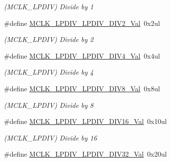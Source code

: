 \begin{DoxyCompactItemize}
\begin{DoxyCompactList}\small\item\em (M\+C\+L\+K\+\_\+\+L\+P\+D\+I\+V) Divide by 1 \end{DoxyCompactList}\item 
\hypertarget{group___s_a_m_l21___m_c_l_k_gac227ee23da578cc1218555697aceb4b8}{}\#define \hyperlink{group___s_a_m_l21___m_c_l_k_gac227ee23da578cc1218555697aceb4b8}{M\+C\+L\+K\+\_\+\+L\+P\+D\+I\+V\+\_\+\+L\+P\+D\+I\+V\+\_\+\+D\+I\+V2\+\_\+\+Val}~0x2ul\label{group___s_a_m_l21___m_c_l_k_gac227ee23da578cc1218555697aceb4b8}

\begin{DoxyCompactList}\small\item\em (M\+C\+L\+K\+\_\+\+L\+P\+D\+I\+V) Divide by 2 \end{DoxyCompactList}\item 
\hypertarget{group___s_a_m_l21___m_c_l_k_ga5e716c7a9dbe745b4da5fc7921452a6a}{}\#define \hyperlink{group___s_a_m_l21___m_c_l_k_ga5e716c7a9dbe745b4da5fc7921452a6a}{M\+C\+L\+K\+\_\+\+L\+P\+D\+I\+V\+\_\+\+L\+P\+D\+I\+V\+\_\+\+D\+I\+V4\+\_\+\+Val}~0x4ul\label{group___s_a_m_l21___m_c_l_k_ga5e716c7a9dbe745b4da5fc7921452a6a}

\begin{DoxyCompactList}\small\item\em (M\+C\+L\+K\+\_\+\+L\+P\+D\+I\+V) Divide by 4 \end{DoxyCompactList}\item 
\hypertarget{group___s_a_m_l21___m_c_l_k_ga03b73cc67f8190dd558d476a0bffca16}{}\#define \hyperlink{group___s_a_m_l21___m_c_l_k_ga03b73cc67f8190dd558d476a0bffca16}{M\+C\+L\+K\+\_\+\+L\+P\+D\+I\+V\+\_\+\+L\+P\+D\+I\+V\+\_\+\+D\+I\+V8\+\_\+\+Val}~0x8ul\label{group___s_a_m_l21___m_c_l_k_ga03b73cc67f8190dd558d476a0bffca16}

\begin{DoxyCompactList}\small\item\em (M\+C\+L\+K\+\_\+\+L\+P\+D\+I\+V) Divide by 8 \end{DoxyCompactList}\item 
\hypertarget{group___s_a_m_l21___m_c_l_k_gae8321fe2a5533dd1a11004517f41e489}{}\#define \hyperlink{group___s_a_m_l21___m_c_l_k_gae8321fe2a5533dd1a11004517f41e489}{M\+C\+L\+K\+\_\+\+L\+P\+D\+I\+V\+\_\+\+L\+P\+D\+I\+V\+\_\+\+D\+I\+V16\+\_\+\+Val}~0x10ul\label{group___s_a_m_l21___m_c_l_k_gae8321fe2a5533dd1a11004517f41e489}

\begin{DoxyCompactList}\small\item\em (M\+C\+L\+K\+\_\+\+L\+P\+D\+I\+V) Divide by 16 \end{DoxyCompactList}\item 
\hypertarget{group___s_a_m_l21___m_c_l_k_ga8e43281ced7f337fcb3969549fc20758}{}\#define \hyperlink{group___s_a_m_l21___m_c_l_k_ga8e43281ced7f337fcb3969549fc20758}{M\+C\+L\+K\+\_\+\+L\+P\+D\+I\+V\+\_\+\+L\+P\+D\+I\+V\+\_\+\+D\+I\+V32\+\_\+\+Val}~0x20ul\label{group___s_a_m_l21___m_c_l_k_ga8e43281ced7f337fcb3969549fc20758}


\end{DoxyCompactItemize}
